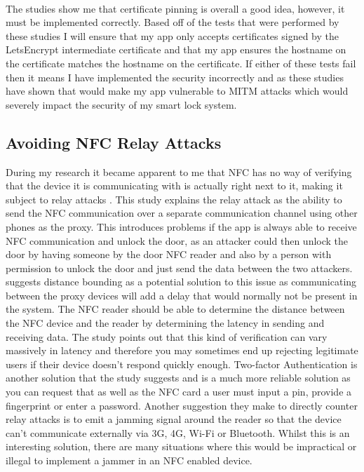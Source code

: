 \documentclass[10pt, a4paper]{article}
\begin{document}
\\
\indent The studies show me that certificate pinning is overall a good idea, however, it must be implemented correctly. Based off of the tests that were performed by these studies I will ensure that my app only accepts certificates signed by the LetsEncrypt intermediate certificate and that my app ensures the hostname on the certificate matches the hostname on the certificate. If either of these tests fail then it means I have implemented the security incorrectly and as these studies have shown that would make my app vulnerable to MITM attacks which would severely impact the security of my smart lock system.

\subsection{Avoiding NFC Relay Attacks}
During my research it became apparent to me that NFC has no way of verifying that the device it is communicating with is actually right next to it, making it subject to relay attacks \citep{Francis2010}. This study explains the relay attack as the ability to send the NFC communication over a separate communication channel using other phones as the proxy. This introduces problems if the app is always able to receive NFC communication and unlock the door, as an attacker could then unlock the door by having someone by the door NFC reader and also by a person with permission to unlock the door and just send the data between the two attackers. \cite{Oh2015} suggests distance bounding as a potential solution to this issue as communicating between the proxy devices will add a delay that would normally not be present in the system. The NFC reader should be able to determine the distance between the NFC device and the reader by determining the latency in sending and receiving data. The study points out that this kind of verification can vary massively in latency and therefore you may sometimes end up rejecting legitimate users if their device doesn't respond quickly enough. Two-factor Authentication is another solution that the study suggests and is a much more reliable solution as you can request that as well as the NFC card a user must input a pin, provide a fingerprint or enter a password. Another suggestion they make to directly counter relay attacks is to emit a jamming signal around the reader so that the device can't communicate externally via 3G, 4G, Wi-Fi or Bluetooth. Whilst this is an interesting solution, there are many situations where this would be impractical or illegal to implement a jammer in an NFC enabled device.
\end{document}
